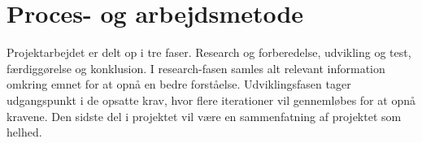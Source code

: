 \section{Proces- og arbejdsmetode}
Projektarbejdet er delt op i tre faser. Research og forberedelse, udvikling og test, færdiggørelse og konklusion. I research-fasen samles alt relevant information omkring emnet for at opnå en bedre forståelse. Udviklingsfasen tager udgangspunkt i de opsatte krav, hvor flere iterationer vil gennemløbes for at opnå kravene. Den sidste del i projektet vil være en sammenfatning af projektet som helhed.




